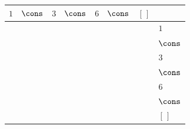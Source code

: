 {\scriptsize\setlength{\tabcolsep}{1.5pt}%
\begin{tabular}{ccccccc|l}
$\text{1}$ & $\cons$ & $\text{3}$ & $\cons$ & $\text{6}$ & $\cons$ & $[\,]$ & \\ \hline
\gcell{$\posD{\bullet}$} & \gcell{$\posC{\circ}$} & \gcell{$\posD{\bullet}$} & \gcell{$\posC{\circ}$} & \gcell{$\posC{\circ}$} & \gcell{$\posC{\circ}$} & \gcell{$\posC{\circ}$} & $\text{1}$ \\
\gcell{$\posC{\circ}$} & \gcell{$\posC{\circ}$} & \gcell{$\posC{\circ}$} & \gcell{$\posC{\circ}$} & \gcell{$\posC{\circ}$} & \gcell{$\posC{\circ}$} & \gcell{$\posC{\circ}$} & $\cons$ \\
\gcell{$\posD{\bullet}$} & \gcell{$\posC{\circ}$} & \gcell{$\posD{\bullet}$} & \gcell{$\posC{\circ}$} & \gcell{$\posD{\bullet}$} & \gcell{$\posC{\circ}$} & \gcell{$\posC{\circ}$} & $\text{3}$ \\
\gcell{$\posC{\circ}$} & \gcell{$\posC{\circ}$} & \gcell{$\posC{\circ}$} & \gcell{$\posC{\circ}$} & \gcell{$\posC{\circ}$} & \gcell{$\posC{\circ}$} & \gcell{$\posC{\circ}$} & $\cons$ \\
\gcell{$\posC{\circ}$} & \gcell{$\posC{\circ}$} & \gcell{$\posD{\bullet}$} & \gcell{$\posC{\circ}$} & \gcell{$\posD{\bullet}$} & \gcell{$\posC{\circ}$} & \gcell{$\posC{\circ}$} & $\text{6}$ \\
\gcell{$\posC{\circ}$} & \gcell{$\posC{\circ}$} & \gcell{$\posC{\circ}$} & \gcell{$\posC{\circ}$} & \gcell{$\posC{\circ}$} & \gcell{$\posC{\circ}$} & \gcell{$\posC{\circ}$} & $\cons$ \\
\gcell{$\posC{\circ}$} & \gcell{$\posC{\circ}$} & \gcell{$\posC{\circ}$} & \gcell{$\posC{\circ}$} & \gcell{$\posC{\circ}$} & \gcell{$\posC{\circ}$} & \gcell{$\posC{\circ}$} & $[\,]$ \\
\end{tabular}}
